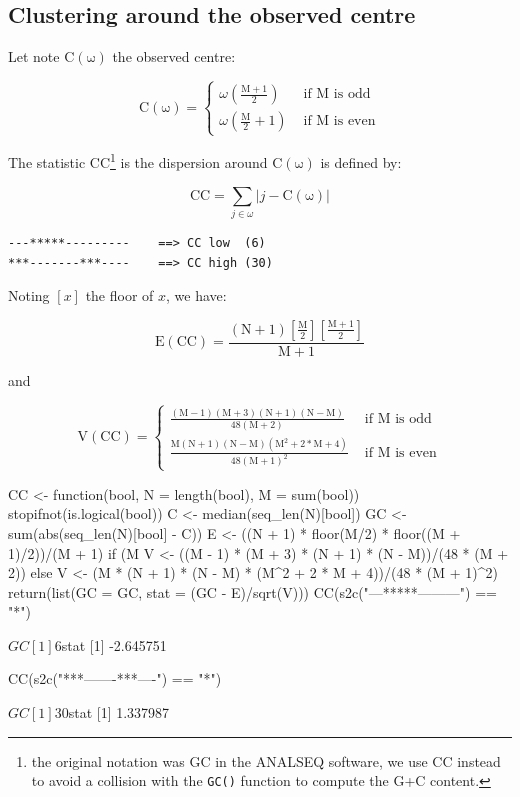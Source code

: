 \documentclass{article}
\begin{document}
\subsection{Clustering around the observed centre}

Let note $\mathrm{C(\omega)}$ the observed centre:

$$
\mathrm{C(\omega)} = \left\{ \begin{array}{rl}
 \omega\left(\mathrm{\frac{M+1}{2}}\right) &\mbox{ if $\mathrm{M}$ is odd} \\
 \omega\left(\mathrm{\frac{M}{2} + 1}\right) &\mbox{ if $\mathrm{M}$ is even}
       \end{array} \right.
$$

The statistic $\mathrm{CC}$\footnote{
the original notation was GC in the ANALSEQ software, we use CC instead to
avoid a collision with the \texttt{GC()} function to compute the G+C content.
} is the dispersion around $\mathrm{C(\omega)}$ is defined by:

$$
\mathrm{CC} = \sum_{j \in \omega}{\left| j - \mathrm{C(\omega)} \right|}
$$

\begin{verbatim}
---*****---------    ==> CC low  (6)
***-------***----    ==> CC high (30)
\end{verbatim}

Noting $\left[x\right]$ the floor of $x$, we have:

$$
\mathrm{E(CC)} = \mathrm{\frac{(N+1)\left[\frac{M}{2}\right]\left[\frac{M+1}{2}\right]}{M+1}}
$$

and

$$
\mathrm{V(CC)} = \left\{ \begin{array}{rl}
 \mathrm{\frac{(M - 1)(M + 3)(N + 1)(N - M)}{48(M + 2)}} &\mbox{ if $\mathrm{M}$ is odd} \\
 \mathrm{\frac{M(N + 1)(N - M)(M^2 + 2*M + 4)}{48(M + 1)^2}} &\mbox{ if $\mathrm{M}$ is even}
       \end{array} \right.
$$

\begin{Schunk}
\begin{Sinput}
 CC <- function(bool, N = length(bool), M = sum(bool)) {
     stopifnot(is.logical(bool))
     C <- median(seq_len(N)[bool])
     GC <- sum(abs(seq_len(N)[bool] - C))
     E <- ((N + 1) * floor(M/2) * floor((M + 1)/2))/(M + 1)
     if (M%
         V <- ((M - 1) * (M + 3) * (N + 1) * (N - M))/(48 * 
             (M + 2))
     else V <- (M * (N + 1) * (N - M) * (M^2 + 2 * M + 4))/(48 * 
         (M + 1)^2)
     return(list(GC = GC, stat = (GC - E)/sqrt(V)))
 }
 CC(s2c("---*****---------") == "*")
\end{Sinput}
\begin{Soutput}
$GC
[1] 6

$stat
[1] -2.645751
\end{Soutput}
\begin{Sinput}
 CC(s2c("***-------***----") == "*")
\end{Sinput}
\begin{Soutput}
$GC
[1] 30

$stat
[1] 1.337987
\end{Soutput}
\end{Schunk}
\end{document}
